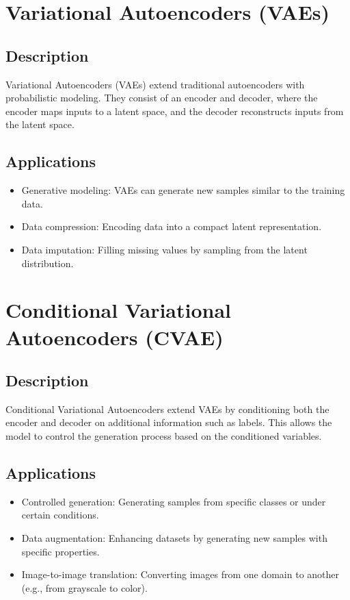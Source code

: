 \documentclass{article}
\begin{document}
\section{Variational Autoencoders (VAEs)}

\subsection{Description}
Variational Autoencoders (VAEs) extend traditional autoencoders with probabilistic modeling. They consist of an encoder and decoder, where the encoder maps inputs to a latent space, and the decoder reconstructs inputs from the latent space.

\subsection{Applications}
\begin{itemize}
    \item Generative modeling: VAEs can generate new samples similar to the training data.
    \item Data compression: Encoding data into a compact latent representation.
    \item Data imputation: Filling missing values by sampling from the latent distribution.
\end{itemize}

\section{Conditional Variational Autoencoders (CVAE)}

\subsection{Description}
Conditional Variational Autoencoders extend VAEs by conditioning both the encoder and decoder on additional information such as labels. This allows the model to control the generation process based on the conditioned variables.

\subsection{Applications}
\begin{itemize}
    \item Controlled generation: Generating samples from specific classes or under certain conditions.
    \item Data augmentation: Enhancing datasets by generating new samples with specific properties.
    \item Image-to-image translation: Converting images from one domain to another (e.g., from grayscale to color).
\end{itemize}
\end{document}
